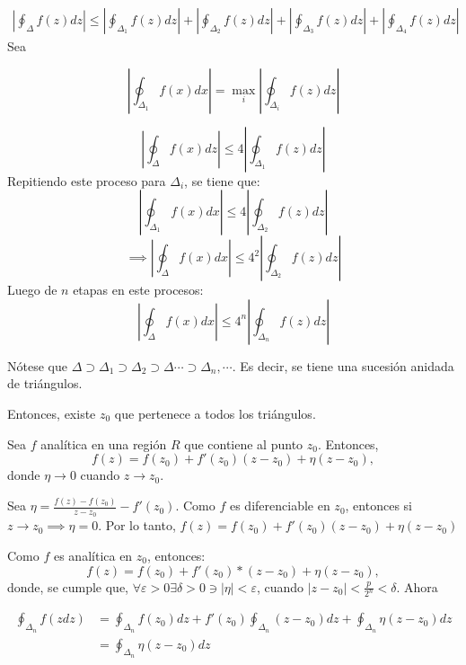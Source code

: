 \begin{teorema}
\begin{dem}
        \begin{align*}
            \left|\oint_\Delta f(z)dz\right|\leq \left|\oint_{\Delta_1} f(z)dz\right|+\left|\oint_{\Delta_2} f(z)dz\right|+\left|\oint_{\Delta_3} f(z)dz\right|+\left|\oint_{\Delta_4} f(z)dz\right|
        \end{align*}
        Sea 

        $$\left|\oint_{\Delta_1}f(x)dx\right|=\max_i\left|\oint_{\Delta_i}f(z)dz\right|$$

        $$\left|\oint_{\Delta}f(x)dz\right| \leq 4\left|\oint_{\Delta_1}f(z)dz\right|$$
        Repitiendo este proceso para $\Delta_i$, se tiene que:
        $$\left|\oint_{\Delta_1}f(x)dx\right| \leq 4\left|\oint_{\Delta_2}f(z)dz\right|$$
        $$\implies \left|\oint_{\Delta}f(x)dx\right| \leq 4^2\left|\oint_{\Delta_2}f(z)dz\right|$$
        Luego de $n$ etapas en este procesos: 
        $$\left|\oint_{\Delta}f(x)dx\right| \leq 4^n\left|\oint_{\Delta_n}f(z)dz\right|$$
        \begin{cajita}
            Nótese que $\Delta\supset \Delta_1\supset\Delta_2\supset \Delta \cdots\supset \Delta_n,\cdots $. Es decir, se tiene una sucesión anidada de triángulos.
        \end{cajita}

        Entonces, existe $z_0$ que pertenece a todos los triángulos. 
        \begin{cajita}
            \begin{lema}
                Sea $f$ analítica en una región $R$ que contiene al punto $z_0$. Entonces, 
                $$f(z)=f(z_0)+f'(z_0)(z-z_0)+\eta (z-z_0),$$
                donde $\eta\to 0$ cuando $z\to z_0$.
                \begin{dem}
                    Sea $\eta=\frac{f(z)-f(z_0)}{z-z_0}-f'(z_0)$. Como $f$ es diferenciable en $z_0$, entonces si $z\to z_0\implies \eta=0$. Por lo tanto, $f(z)=f(z_0)+f'(z_0)(z-z_0)+\eta(z-z_0)$
                \end{dem}
            \end{lema}
        \end{cajita}
        Como $f$ es analítica en $z_0$, entonces: 
        $$f(z)=f(z_0)+f'(z_0)*(z-z_0)+\eta(z-z_0),$$
        donde, se cumple que, $\forall \varepsilon >0\exists \delta>0\ni |\eta|<\varepsilon$, cuando $|z-z_0|<\frac{p}{2^n}<\delta$. Ahora 

        \begin{align*}
            \oint_{\Delta_n}f(zdz)&=\oint_{\Delta_n}f(z_0)dz+f'(z_0)\oint_{\Delta_n}(z-z_0)dz+\oint_{\Delta_n}\eta(z-z_0)dz\\
            &= \oint_{\Delta_n}\eta(z-z_0)dz
        \end{align*}
        

\end{dem}
\end{teorema}
